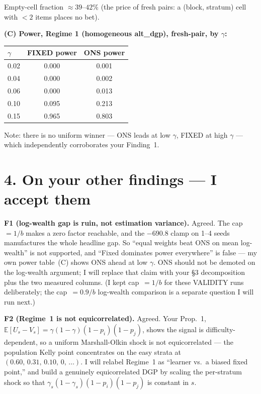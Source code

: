 \documentclass[11pt,a4paper]{article}
\begin{document}
\medskip
\noindent Empty-cell fraction $\approx 39$--$42\%$ (the price of fresh pairs: a
(block, stratum) cell with $< 2$ items places no bet).

\bigskip

\noindent\textbf{(C) Power, Regime 1 (homogeneous alt\_dgp), fresh-pair, by $\gamma$:}

\medskip
\begin{center}
\begin{tabular}{lcc}
\toprule
$\gamma$ & FIXED power & ONS power \\
\midrule
0.02 & 0.000 & 0.001 \\
0.04 & 0.000 & 0.002 \\
0.06 & 0.000 & 0.013 \\
0.10 & 0.095 & 0.213 \\
0.15 & 0.965 & 0.803 \\
\bottomrule
\end{tabular}
\end{center}

\medskip
\noindent Note: there is no uniform winner --- ONS leads at low $\gamma$, FIXED at
high $\gamma$ --- which independently corroborates your Finding~1.

\section*{4. On your other findings --- I accept them}

\textbf{F1 (log-wealth gap is ruin, not estimation variance).} Agreed. The
cap~$= 1/b$ makes a zero factor reachable, and the $-690.8$ clamp on 1--4 seeds
manufactures the whole headline gap. So ``equal weights beat ONS on mean
log-wealth'' is not supported, and ``Fixed dominates power everywhere'' is false ---
my own power table~(C) shows ONS ahead at low $\gamma$. ONS should not be demoted
on the log-wealth argument; I will replace that claim with your \S3 decomposition
plus the two measured columns. (I kept cap~$= 1/b$ for these VALIDITY runs
deliberately; the cap~$= 0.9/b$ log-wealth comparison is a separate question I will
run next.)

\medskip

\textbf{F2 (Regime~1 is not equicorrelated).} Agreed. Your Prop.~1,
$\mathbb{E}[U_s - V_s] = \gamma(1-\gamma)(1-p_i)(1-p_j)$, shows the signal is
difficulty-dependent, so a uniform Marshall-Olkin shock is not equicorrelated ---
the population Kelly point concentrates on the easy strata at
$(0.60,\, 0.31,\, 0.10,\, 0,\, \ldots)$. I will relabel Regime~1 as ``learner vs.\ a
biased fixed point,'' and build a genuinely equicorrelated DGP by scaling the
per-stratum shock so that $\gamma_s(1-\gamma_s)(1-p_i)(1-p_j)$ is constant in $s$.
\end{document}

